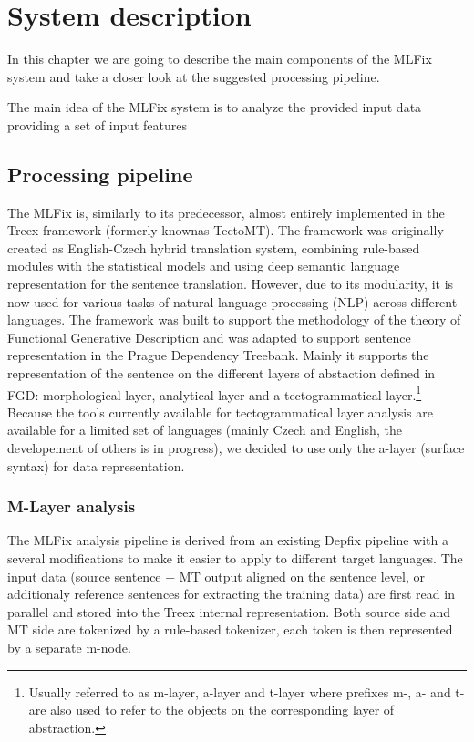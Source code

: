 \chapter{System description}
\label{chap:system_descr}

In this chapter we are going to describe the main components
of the MLFix system and take a closer look at the suggested processing pipeline.

The main idea of the MLFix system is to analyze the provided input data providing
a set of input features 

\section{Processing pipeline}

The MLFix is, similarly to its predecessor, almost entirely implemented in the
Treex\cite{Popel:2010:TMN:1884371.1884406}
framework (formerly knownas TectoMT).
The framework was originally created as English-Czech hybrid translation system, combining
rule-based modules with the statistical models and using deep semantic language representation
for the sentence translation. However, due to its modularity, it is
now used for various tasks of natural language processing (NLP) across different
languages. The framework was built to support the methodology of the theory of Functional Generative Description\cite{Sgall1967}
and was adapted to support sentence representation in the Prague Dependency Treebank\cite{pdt20:2006}.
Mainly it supports the representation of the sentence on the different layers of abstaction defined in FGD: morphological layer,
analytical layer and a tectogrammatical layer.\footnote{Usually referred to as m-layer, a-layer and t-layer where prefixes m-, a- and t- are also used to refer to the objects on the corresponding layer of abstraction.}
Because the tools currently available for tectogrammatical layer analysis are available for
a limited set of languages (mainly Czech and English, the developement of others is in progress),
we decided to use only the a-layer (surface syntax) for data representation.

\subsection{M-Layer analysis}
The MLFix analysis pipeline is derived from an existing Depfix pipeline
with a several modifications to make it easier to apply to different
target languages. The input data (source sentence + MT output aligned on the sentence level,
or additionaly reference sentences for extracting the training data)
are first read in parallel and stored into the Treex internal representation.
Both source side and MT side are tokenized by a rule-based tokenizer, each token is then
represented by a separate m-node.

